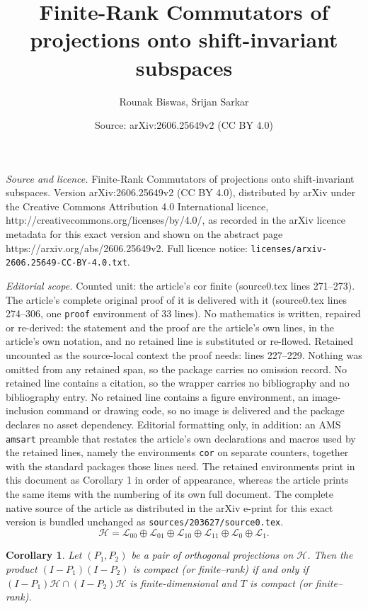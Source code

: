 \documentclass[10pt,a4paper]{amsart}
\title{Finite-Rank Commutators of projections onto shift-invariant subspaces}
\author{Rounak Biswas, Srijan Sarkar}
\date{Source: arXiv:2606.25649v2 (CC BY 4.0)}
\newtheorem{cor}{Corollary}
\newcommand{\clh}{\mathcal{H}}
\newcommand{\cll}{\mathcal{L}}
\begin{document}
\maketitle

\noindent\emph{Source and licence.} Finite-Rank Commutators of projections onto shift-invariant subspaces. Version arXiv:2606.25649v2 (CC BY 4.0), distributed by arXiv under the Creative Commons Attribution 4.0 International licence, http://creativecommons.org/licenses/by/4.0/, as recorded in the arXiv licence metadata for this exact version and shown on the abstract page https://arxiv.org/abs/2606.25649v2. Full licence notice: \texttt{licenses/arxiv-2606.25649-CC-BY-4.0.txt}.\par\smallskip

\noindent\textit{Editorial scope.} Counted unit: the article's cor finite (source0.tex lines 271--273). The article's complete original proof of it is delivered with it (source0.tex lines 274--306, one \texttt{proof} environment of 33 lines). No mathematics is written, repaired or re-derived: the statement and the proof are the article's own lines, in the article's own notation, and no retained line is substituted or re-flowed.  Retained uncounted as the source-local context the proof needs: lines 227--229.  Nothing was omitted from any retained span, so the package carries no omission record.  No retained line contains a citation, so the wrapper carries no bibliography and no bibliography entry.  No retained line contains a figure environment, an image-inclusion command or drawing code, so no image is delivered and the package declares no asset dependency.  Editorial formatting only, in addition: an AMS \texttt{amsart} preamble that restates the article's own declarations and macros used by the retained lines, namely the environments \texttt{cor} on separate counters, together with the standard packages those lines need.  The retained environments print in this document as Corollary 1 in order of appearance, whereas the article prints the same items with the numbering of its own full document.  The complete native source of the article as distributed in the arXiv e-print for this exact version is bundled unchanged as \texttt{sources/203627/source0.tex}.
\begin{equation}\label{Halmos_decomp}
 \mathcal{H}=\cll_{00}\oplus \cll_{01}\oplus \cll_{10}\oplus \cll_{11}\oplus \cll_0\oplus \cll_1.
\end{equation}

    \begin{cor}\label{K finite}
Let $(P_1, P_2)$ be a pair of orthogonal projections on $\clh$. Then the product $(I - P_1)(I - P_2)$ is compact (or finite--rank) if and only if $(I - P_1) \clh \cap (I - P_2)\clh$ is finite-dimensional and $T$ is compact (or finite--rank).
\end{cor}
\end{document}
